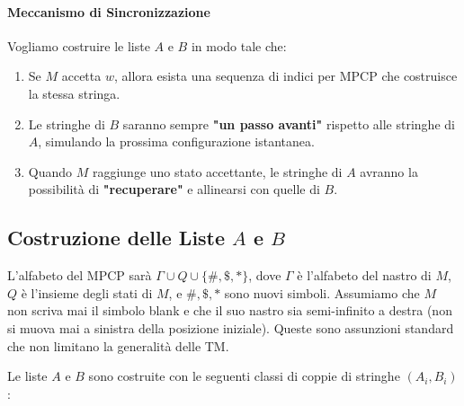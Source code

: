 \documentclass[a4paper]{article}
\theoremstyle{definition} %
\theoremstyle{remark} %
\begin{document}
\paragraph{Meccanismo di Sincronizzazione}
Vogliamo costruire le liste $A$ e $B$ in modo tale che:
\begin{enumerate}
    \item Se $M$ accetta $w$, allora esista una sequenza di indici per MPCP che costruisce la stessa stringa.
    \item Le stringhe di $B$ saranno sempre \textbf{"un passo avanti"} rispetto alle stringhe di $A$, simulando la prossima configurazione istantanea.
    \item Quando $M$ raggiunge uno stato accettante, le stringhe di $A$ avranno la possibilità di \textbf{"recuperare"} e allinearsi con quelle di $B$.
\end{enumerate}

\subsection{Costruzione delle Liste $A$ e $B$}
L'alfabeto del MPCP sarà $\Gamma \cup Q \cup \{\#, \$, *\}$, dove $\Gamma$ è l'alfabeto del nastro di $M$, $Q$ è l'insieme degli stati di $M$, e $\#, \$, *$ sono nuovi simboli.
Assumiamo che $M$ non scriva mai il simbolo blank e che il suo nastro sia semi-infinito a destra (non si muova mai a sinistra della posizione iniziale). Queste sono assunzioni standard che non limitano la generalità delle TM.

Le liste $A$ e $B$ sono costruite con le seguenti classi di coppie di stringhe $(A_i, B_i)$:
\end{document}
